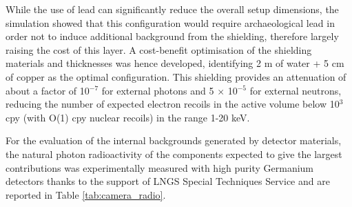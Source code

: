 \documentclass[physics,article,submit,moreauthors,pdftex]{Definitions/mdpi}
\begin{document}
While the use of lead can significantly reduce the overall setup dimensions, the simulation showed that this configuration would require archaeological lead in order not to induce additional background from the shielding, therefore largely raising the cost of this layer. A cost-benefit optimisation of the shielding materials and thicknesses was hence developed, identifying 2 m of water + 5 cm of copper as the optimal configuration. This shielding provides an attenuation of about a factor of 10$^{-7}$ for external photons and 5 $\times$ 10$^{-5}$ for external neutrons, reducing the number of expected electron recoils in the active volume below 10$^3$ cpy (with O(1) cpy nuclear recoils) in the range 1-20 keV. 

\begin{table}[t]
    \centering
    \caption{Measured activity of the internal detector components expected to produce the largest backgrounds in the active volume. The isotopes in parentheses indicate the activity from that particular part of the decay chain. Upper limits are given at 90\% confidence level.}
    \label{tab:camera_radio}
\end{table}

 

For the evaluation of the internal backgrounds generated by detector materials, the natural photon radioactivity of the components expected to give the largest contributions was experimentally measured with high purity Germanium detectors thanks to the support of LNGS Special Techniques Service and are reported in Table \ref{tab:camera_radio}. 
\end{document}
